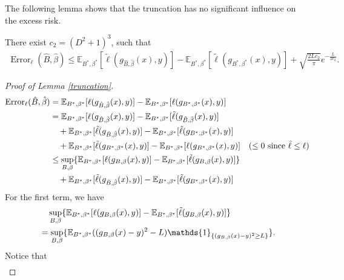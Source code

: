 The following lemma shows that the truncation has no significant influence on the excess risk.
\begin{lemma} \label{truncation}
There exist $c_{2}=(D^{2}+1)^3$, such that 
\begin{align}
\operatorname{Error}_{\ell}(\hat{B}, \hat{\beta}) \leq  
\mathbb{E}_{B^{*},\beta^{*}}[\tilde{\ell} (g_{\hat{B},\hat{\beta}}(x),y)] - \mathbb{E}_{B^{*},\beta^{*}}[\tilde{\ell} (g_{B^{*},\beta^{*}}(x),y)] + \sqrt{\frac{2Lc_{2}}{\pi}}e^{-\frac{L}{2c_{2}}}.
\end{align}
\end{lemma}
\begin{proof}[Proof of Lemma \ref{truncation}]
\begin{align}\label{092720}
\operatorname{Error}_{\ell}(\hat{B}, \hat{\beta}) &= \mathbb{E}_{B^{*},\beta^{*}}[\ell (g_{\hat{B},\hat{\beta}}(x),y)] - \mathbb{E}_{B^{*},\beta^{*}}[\ell (g_{B^{*},\beta^{*}}(x),y)] \notag \\
& =  \mathbb{E}_{B^{*},\beta^{*}}[\ell (g_{\hat{B},\hat{\beta}}(x),y)] - \mathbb{E}_{B^{*},\beta^{*}}[\tilde{\ell} (g_{\hat{B},\hat{\beta}}(x),y)]\notag \\
& \quad +\mathbb{E}_{B^{*},\beta^{*}}[\tilde{\ell} (g_{\hat{B},\hat{\beta}}(x),y)] - \mathbb{E}_{B^{*},\beta^{*}}[\tilde{\ell} (g_{B^{*},\beta^{*}}(x),y)] \notag \\
& \quad + \mathbb{E}_{B^{*},\beta^{*}}[\tilde{\ell} (g_{B^{*},\beta^{*}}(x),y)] - \mathbb{E}_{B^{*},\beta^{*}}[\ell (g_{B^{*},\beta^{*}}(x),y)] \quad (\leq 0 \text{ since } \tilde{\ell} \leq \ell ) \notag \\
& \leq \sup_{B,\beta} \{ \mathbb{E}_{B^{*},\beta^{*}}[\ell (g_{B,\beta}(x),y)] - \mathbb{E}_{B^{*},\beta^{*}}[\tilde{\ell} (g_{B,\beta}(x),y)] \} \notag \\ 
& \quad + \mathbb{E}_{B^{*},\beta^{*}}[\tilde{\ell} (g_{\hat{B},\hat{\beta}}(x),y)] - \mathbb{E}_{B^{*},\beta^{*}}[\tilde{\ell} (g_{B^{*},\beta^{*}}(x),y)]
\end{align}
For the first term, we have
\begin{align}\label{092721}
& \quad \sup_{B,\beta} \{ \mathbb{E}_{B^{*},\beta^{*}}[\ell (g_{B,\beta}(x),y)] - \mathbb{E}_{B^{*},\beta^{*}}[\tilde{\ell} (g_{B,\beta}(x),y)] \} \notag \\
&= \sup_{B,\beta} \{\mathbb{E}_{B^{*},\beta^{*}} ((g_{B,\beta}(x)-y)^{2}-L) \mathds{1}_{\{(g_{B,\beta}(x)-y)^{2} \geq L\}}  \}.
\end{align}
Notice that
\begin{align}

\end{align}
\end{proof}
